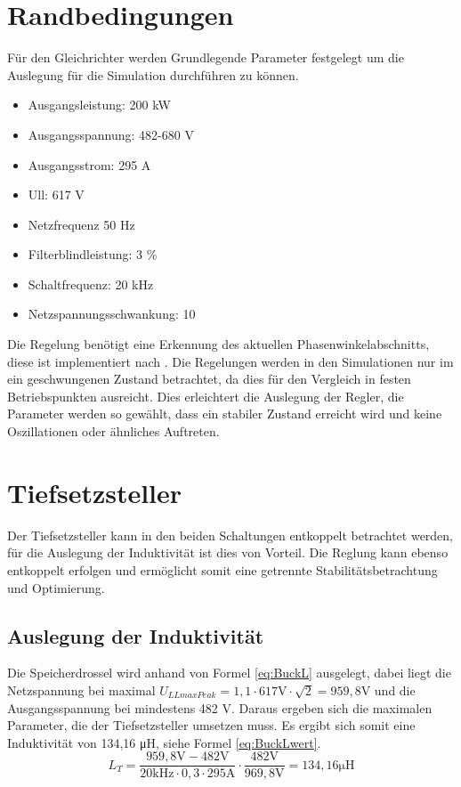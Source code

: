 \section{Randbedingungen}
Für den Gleichrichter werden Grundlegende Parameter festgelegt um die Auslegung für die Simulation durchführen zu können. 

\begin{itemize}
\item Ausgangsleistung: 200 kW
\item Ausgangsspannung: 482-680 V
\item Ausgangsstrom: 	295 A
\item \gls{Ull}:		617 V
\item Netzfrequenz		50 Hz
\item Filterblindleistung: 3 \%
\item Schaltfrequenz: 20 kHz
\item Netzspannungsschwankung: 10%
\end{itemize}

Die Regelung benötigt eine Erkennung des aktuellen Phasenwinkelabschnitts, diese ist implementiert nach \cite{InstituteofElectricalandElectronicsEngineers}.
Die Regelungen werden in den Simulationen nur im ein geschwungenen Zustand betrachtet, da dies für den Vergleich in festen Betriebspunkten ausreicht. Dies erleichtert die Auslegung der Regler, die Parameter werden so gewählt, dass ein stabiler Zustand erreicht wird und keine Oszillationen oder ähnliches Auftreten. 

\section{Tiefsetzsteller}
	Der Tiefsetzsteller kann in den beiden Schaltungen entkoppelt betrachtet werden, für die Auslegung der Induktivität ist dies von Vorteil. Die Reglung kann ebenso entkoppelt erfolgen und ermöglicht somit eine getrennte Stabilitätsbetrachtung und Optimierung. 
	\subsection{Auslegung der Induktivität}
	Die Speicherdrossel wird anhand von Formel \ref{eq:BuckL} ausgelegt, dabei liegt die Netzspannung bei maximal $U_{LLmaxPeak}=1,1 \cdot 617 \si{\V} \cdot \sqrt{2}=959,8 \si{\V}$ und die Ausgangsspannung bei mindestens 482 \si{\V}. Daraus ergeben sich die maximalen Parameter, die der Tiefsetzsteller umsetzen muss. Es ergibt sich somit eine Induktivität von 134,16 \si{\micro \henry}, siehe Formel \ref{eq:BuckLwert}.
	\begin{equation}
	\label{eq:BuckLwert}
	L_{T}=\dfrac{959,8\si{\V} - 482 \si{\V}}{20 \si{\kilo \hertz}\cdot 0,3 \cdot 295 \si{\ampere}}\cdot \dfrac{482 \si{\V}}{969,8 \si{\V}}= 134,16 \si{\micro \henry} 
	\end{equation}

